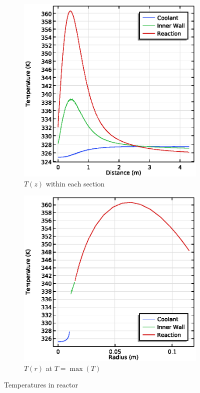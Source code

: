 \begin{figure}[p]
    \begin{minipage}{\linewidth}
        \centering
        \begin{subfigure}{0.45\linewidth}
            \includegraphics[width=\linewidth]{figures/temperature-lines.eps}
            \caption{$T(z)$ within each section}
            \label{fig:comsol-temperature:lines}
        \end{subfigure}\hspace{\floatsep}
        \begin{subfigure}{0.45\linewidth}
            \includegraphics[width=\linewidth]{figures/Tr-maxT.eps}
            \caption{$T(r)$ at $T = \max(T)$}
            \label{fig:comsol-temperature:radial}
        \end{subfigure}
        \caption{Temperatures in reactor}
        \label{fig:comsol-temperature}
    \end{minipage}
    
\end{figure}
